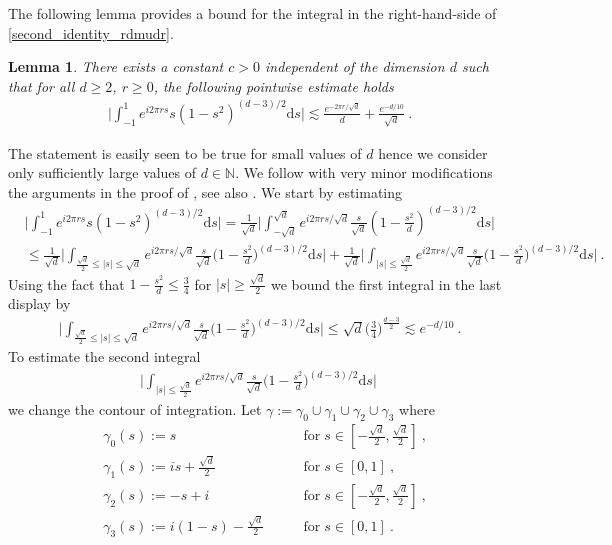 \documentclass[a4paper, reqno]{amsart}
\newtheorem{lemma}[thm]{Lemma}
\theoremstyle{definition}
\newcommand{\dd}{{\mathrm d}}
\begin{document}
The following lemma provides a bound for the integral in the right-hand-side of \eqref{second_identity_rdmudr}.
\begin{lemma}
    There exists a constant $c>0$ independent of the dimension $d$ such that for all $d\geq 2$, $r\ge 0$, the following pointwise estimate holds
    \begin{align}\label{estimate_as_in_MSW}
       \bigg| \int_{-1}^1 e^{i2\pi rs}s(1-s^2)^{(d-3)/2}\dd s \bigg| \lesssim \frac{e^{-2\pi r/\sqrt{d}}}{d}+\frac{e^{-d/10}}{\sqrt{d}}~.
    \end{align}
\end{lemma}
\proof The statement is easily seen to be true for small values of $d$ hence we consider only sufficiently large values of $d\in\mathbb{N}$. We follow with very minor modifications the arguments in the proof of \cite[Lemma~4.1]{MSW24}, see also \cite[Lemma~3.6]{KW23}. We start by estimating
\begin{align*}
     &\bigg| \int_{-1}^1  e^{i2\pi rs}s(1-s^2)^{(d-3)/2}\dd s \bigg| = \frac{1}{\sqrt{d}}\bigg| \int_{-\sqrt{d}}^{\sqrt{d}} e^{i2\pi rs/ \sqrt{d}}\frac{s}{\sqrt{d}}(1-\frac{s^2}{d})^{(d-3)/2}\dd s \bigg|\\
          &\leq \frac{1}{\sqrt{d}}\bigg| \int_{\tfrac{\sqrt{d}}{2}\leq |s|\leq \sqrt{d}} e^{i2\pi rs/\sqrt{d}}\frac{s}{\sqrt{d}}\bigg(1-\frac{s^2}{d}\bigg)^{(d-3)/2}\dd s \bigg| + \frac{1}{\sqrt{d}}\bigg| \int_{|s|\leq \tfrac{\sqrt{d}}{2}} e^{i2\pi rs/ \sqrt{d}}\frac{s}{\sqrt{d}}\bigg(1-\frac{s^2}{d}\bigg)^{(d-3)/2}\dd s \bigg|~.
\end{align*}
Using the fact that $1-\frac{s^2}{d}\leq \frac{3}{4}$ for $|s|\geq \frac{\sqrt{d}}{2}$ we bound the first integral in the last display by
\begin{align*}
   \bigg| \int_{\tfrac{\sqrt{d}}{2}\leq |s|\leq \sqrt{d}} e^{i2\pi rs/\sqrt{d}}\frac{s}{\sqrt{d}}\bigg(1-\frac{s^2}{d}\bigg)^{(d-3)/2}\dd s \bigg|\leq \sqrt{d}\bigg( \frac{3}{4}\bigg)^{\tfrac{d-3}{2}}\lesssim e^{-d/10}~.
\end{align*}
To estimate the second integral
     \begin{align*}
      \bigg| \int_{|s|\leq \tfrac{\sqrt{d}}{2}} e^{i2\pi rs/ \sqrt{d}}\frac{s}{\sqrt{d}}\bigg(1-\frac{s^2}{d}\bigg)^{(d-3)/2}\dd s \bigg|~
      \end{align*}
we change the contour of integration. Let $\gamma:=\gamma_0\cup\gamma_1\cup\gamma_2\cup\gamma_3$ where
\begin{align*}
    &\gamma_0(s):=s \qquad &\text{for} \; s\in[-\tfrac{\sqrt{d}}{2},\tfrac{\sqrt{d}}{2}]~,\\
    &\gamma_1(s):=is+\frac{\sqrt{d}}{2} \qquad &\text{for} \; s\in[0,1]~,\\
    &\gamma_2(s):=-s+i \qquad &\text{for} \; s\in[-\tfrac{\sqrt{d}}{2},\tfrac{\sqrt{d}}{2}]~,\\
     &\gamma_3(s):=i(1-s)-\frac{\sqrt{d}}{2} \qquad &\text{for} \; s\in[0,1]~.
\end{align*}
\end{document}
